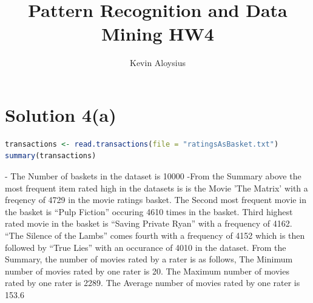 \documentclass[a4paper,20pt]{article}
\title{Pattern Recognition and Data Mining HW4}
\author{Kevin Aloysius}
\begin{document}
\maketitle

\section*{Solution 4(a)}

\begin{lstlisting}[language=R]
transactions <- read.transactions(file = "ratingsAsBasket.txt")
summary(transactions)
\end{lstlisting}

- The Number of baskets in the dataset is 10000
\newline
\newline
-From the Summary above the most frequent item rated high in the datasets is is the Movie 'The Matrix' with a freqency of 4729 in the movie ratings basket.
The Second most frequent movie in the basket is ``Pulp Fiction'' occuring 4610 times in the basket. Third highest rated movie in the basket is
``Saving Private Ryan'' with a frequency of 4162.  ``The Silence of the Lambs'' comes fourth
with a frequency of 4152 which is then followed by ``True Lies'' with an occurance of 4010 in the dataset.
\newline
\newline
From the Summary, the number of movies rated by a rater is as follows,\newline
The Minimum number of movies rated by one rater is 20.\newline
The Maximum number of movies rated by one rater is 2289.\newline
The Average number of movies rated by one rater is 153.6\newline
\newpage
\end{document}
